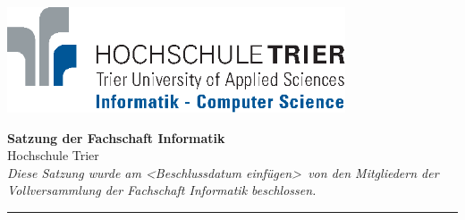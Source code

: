 \documentclass[a4paper, 11pt]{article} %
\begin{document}

\doublespacing
\thispagestyle{empty}

\begin{center}
\includegraphics[width=10.0cm]{logo_faculty_computer_science.eps}

\vspace*{\fill}
{\LARGE \textbf{Satzung der Fachschaft Informatik}}\\
Hochschule Trier\\
\vspace{2.5cm}
\textit{
	Diese Satzung wurde am \textless Beschlussdatum einfügen\textgreater\ von den Mitgliedern der Vollversammlung der Fachschaft Informatik beschlossen.
}
\vfill
\end{center}

\hspace*{-35cm}
\textcolor{fsi}{\rule{64.9cm}{15pt}}
\pagebreak
 
\setcounter{tocdepth}{2}
\tableofcontents 
\pagebreak

\singlespacing






\end{document}

